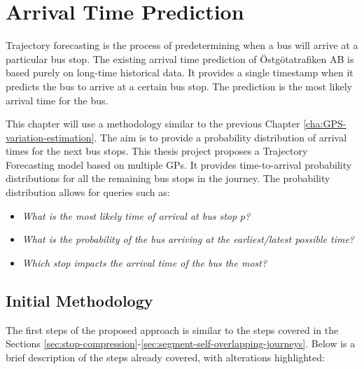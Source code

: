 \chapter{Arrival Time Prediction}
\label{cha:arrival-time-prediction}

Trajectory forecasting is the process of predetermining when a bus will arrive at a particular bus stop.
The existing arrival time prediction of Östgötatrafiken AB is based purely on long-time historical data.
It provides a single timestamp when it predicts the bus to arrive at a certain bus stop.
The prediction is the most likely arrival time for the bus.

This chapter will use a methodology similar to the previous Chapter \ref{cha:GPS-variation-estimation}.
The aim is to provide a probability distribution of arrival times for the next bus stops.
This thesis project proposes a Trajectory Forecasting model based on multiple GPs.
It provides time-to-arrival probability distributions for all the remaining bus stops in the journey.
The probability distribution allows for queries such as:
\begin{itemize}
    \item \textit{What is the most likely time of arrival at bus stop $p$?}
    \item \textit{What is the probability of the bus arriving at the earliest/latest possible time?}
    \item \textit{Which stop impacts the arrival time of the bus the most?}
\end{itemize}

\section{Initial Methodology} \label{sec:initial-methodology}
The first steps of the proposed approach is similar to the steps covered in the Sections \ref{sec:stop-compression}-\ref{sec:segment-self-overlapping-journeys}.
Below is a brief description of the steps already covered, with alterations highlighted:

